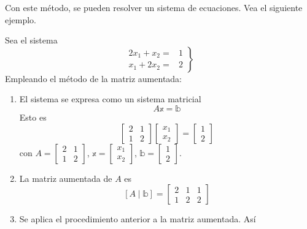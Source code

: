 Con este método, se pueden resolver un sistema de ecuaciones. Vea el siguiente ejemplo. 

\begin{example}
    Sea el sistema
    \begin{equation}
        \left. \begin{array}{rl}
            2x_1+x_2= & \!\!\!\! 1 \\
            x_1+2x_2= & \!\!\!\! 2
        \end{array} \right\} \label{ISJDJUSJSJKZJKOSOPOSO}
    \end{equation}
    Empleando el método de la matriz aumentada:
    \begin{enumerate}
        \item El sistema se expresa como un sistema matricial
        $$A\mathbb{x}=\mathbb{b}$$
        Esto es
        $$\begin{bmatrix}
            2 & 1 \\
            1 & 2
        \end{bmatrix} \begin{bmatrix}
            x_1 \\
            x_2
        \end{bmatrix} = \begin{bmatrix}
            1 \\
            2
        \end{bmatrix}$$
        con $A = \begin{bmatrix}
            2 & 1 \\
            1 & 2
        \end{bmatrix}$, $\mathbb{x} = \begin{bmatrix}
            x_1 \\
            x_2
        \end{bmatrix}$, $\mathbb{b} = \begin{bmatrix}
            1 \\
            2
        \end{bmatrix}$.
        \item La matriz aumentada de $A$ es
        $$[A \mid \mathbb{b}] = \left[ \begin{array}{cc|c}
            2 & 1 & 1 \\
            1 & 2 & 2
        \end{array} \right]$$
        \item Se aplica el procedimiento anterior a la matriz aumentada. Así
        \begin{align*}

\end{align*}
\end{enumerate}
\end{example}
